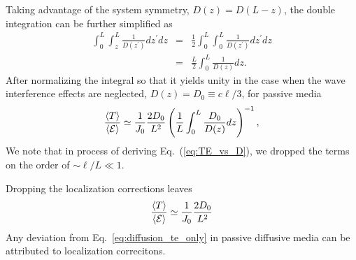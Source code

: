 Taking advantage of the system symmetry, $D(z)=D(L-z)$, the double integration can be further simplified as
\begin{eqnarray}
\displaystyle\int_{0}^{L}\int_{z}^{L}\displaystyle\frac{1}{D(z^\prime)}dz^\prime dz &=&\frac{1}{2}\displaystyle\int_{0}^{L}\int_{0}^{L}\displaystyle\frac{1}{D(z^\prime)}dz^\prime dz \nonumber\\
&=&\frac{L}{2}\int_{0}^{L}\displaystyle\frac{1}{D(z)}dz.
\label{eq:E3}
\end{eqnarray}
After normalizing the integral so that it yields unity in the case when the wave interference effects are neglected, $D(z)=D_0\equiv c\ell/3$, for passive media
\begin{equation}
\frac{\langle T \rangle}{\langle {\cal E} \rangle}\simeq
\frac{1}{J_0}
\frac{2D_0}{L^2}
\left(
\displaystyle\frac{1}{L}\displaystyle\int_{0}^{L}\displaystyle\frac{D_0}{D(z)}dz
\right)^{-1},
\label{eq:TE_vs_D}
\end{equation}
We note that in process of deriving Eq.~(\ref{eq:TE_vs_D}), we dropped the terms on the order of $\sim\ell/L\ll 1$.

Dropping the localization corrections leaves
\begin{equation}
\frac{\langle T \rangle}{\langle {\cal E} \rangle}\simeq \frac{1}{J_0} \frac{2D_0}{L^2}
\label{eq:diffusion_te_only}
\end{equation}
Any deviation from Eq.~\ref{eq:diffusion_te_only} in passive diffusive media can be attributed to localization correcitons.
